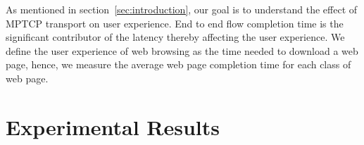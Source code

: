 As mentioned in section~\ref{sec:introduction}, our goal is to understand the effect of MPTCP transport on user experience. End to end flow completion time
is the significant contributor of the latency thereby affecting the user experience.  We define the user experience of web browsing as the time 
needed to download a web page, hence, we measure the average web page completion time for each class of web page.







\section{Experimental Results }
\label{sec:exp-results}


